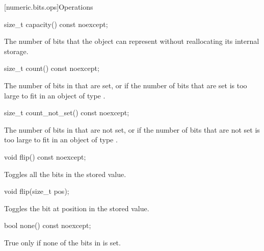 \begin{addedblock}
[numeric.bits.ops]{Operations}

\begin{itemdecl}
size_t capacity() const noexcept;
\end{itemdecl}

\begin{itemdescr}
\returns The number of bits that the object can represent without reallocating its internal storage.
\end{itemdescr}

\begin{itemdecl}
size_t count() const noexcept;
\end{itemdecl}

\begin{itemdescr}
\returns The number of bits in  that are set, or  if the number of bits that are set is too large to fit in an object of type .
\end{itemdescr}

\begin{itemdecl}
size_t count_not_set() const noexcept;
\end{itemdecl}

\begin{itemdescr}
\returns The number of bits in  that are not set, or  if the number of bits that are not set is too large to fit in an object of type .
\end{itemdescr}

\begin{itemdecl}
void flip() const noexcept;
\end{itemdecl}

\begin{itemdescr}
\effects Toggles all the bits in the stored value.
\end{itemdescr}

\begin{itemdecl}
void flip(size_t pos);
\end{itemdecl}

\begin{itemdescr}
\effects Toggles the bit at position  in the stored value.
\end{itemdescr}

\begin{itemdecl}
bool none() const noexcept;
\end{itemdecl}

\begin{itemdescr}
\returns True only if none of the bits in  is set.
\end{itemdescr}


\end{addedblock}
